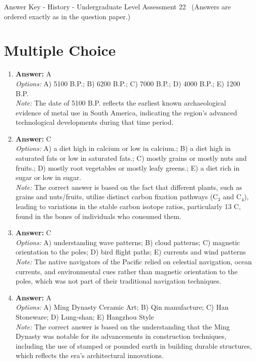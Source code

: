 \documentclass[12pt]{article}
\begin{document}
\begin{center}
Answer Key - History - Undergraduate Level Assessment 22 \
\small (Answers are ordered exactly as in the question paper.)
\end{center}

\section*{Multiple Choice}
\begin{enumerate}[label=\arabic*.]
\item \textbf{Answer:} A
\\ \textit{Options:} A) 5100 B.P.; B) 6200 B.P.; C) 7000 B.P.; D) 4000 B.P.; E) 1200 B.P.
\\ \textit{Note:} The date of 5100 B.P. reflects the earliest known archaeological evidence of metal use in South America, indicating the region's advanced technological developments during that time period.
\item \textbf{Answer:} C
\\ \textit{Options:} A) a diet high in calcium or low in calcium.; B) a diet high in saturated fats or low in saturated fats.; C) mostly grains or mostly nuts and fruits.; D) mostly root vegetables or mostly leafy greens.; E) a diet rich in sugar or low in sugar.
\\ \textit{Note:} The correct answer is based on the fact that different plants, such as grains and nuts/fruits, utilize distinct carbon fixation pathways (C$_{3}$ and C$_{4}$), leading to variations in the stable carbon isotope ratios, particularly 13 C, found in the bones of individuals who consumed them.
\item \textbf{Answer:} C
\\ \textit{Options:} A) understanding wave patterns; B) cloud patterns; C) magnetic orientation to the poles; D) bird flight paths; E) currents and wind patterns
\\ \textit{Note:} The native navigators of the Pacific relied on celestial navigation, ocean currents, and environmental cues rather than magnetic orientation to the poles, which was not part of their traditional navigation techniques.
\item \textbf{Answer:} A
\\ \textit{Options:} A) Ming Dynasty Ceramic Art; B) Qin manufacture; C) Han Stoneware; D) Lung-shan; E) Hangzhou Style
\\ \textit{Note:} The correct answer is based on the understanding that the Ming Dynasty was notable for its advancements in construction techniques, including the use of stamped or pounded earth in building durable structures, which reflects the era's architectural innovations.

\end{enumerate}
\end{document}
